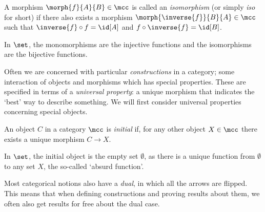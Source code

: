 \begin{definition}[Isomorphism]
    A morphism \(\morph{f}{A}{B} \in \mcc\) is called an \emph{isomorphism} (or
    simply \emph{iso} for short) if there also exists a morphism \(
    \morph{\inverse{f}}{B}{A} \in \mcc
    \) such that \(
    \inverse{f} \circ f = \id[A]
    \) and \(
    f \circ \inverse{f} = \id[B]
    \).
    \begin{center}
    \end{center}
\end{definition}

\begin{example}
    In \(\set\), the monomorphisms are the injective functions and the
    isomorphisms are the bijective functions.
\end{example}

Often we are concerned with particular \emph{constructions} in a category;
some interaction of objects and morphisms which has special properties.
These are specified in terms of a \emph{universal property}: a unique morphism
that indicates the `best' way to describe something.
We will first consider universal properties concerning special objects.

\begin{definition}
    An object \(C\) in a category \(\mcc\) is \emph{initial} if, for any other
    object \(X \in \mcc\) there exists a unique morphism \(C \to X\).
\end{definition}

\begin{example}
    In \(\set\), the initial object is the empty set \(\emptyset\), as there is
    a unique function from \(\emptyset\) to any set \(X\), the so-called
    `absurd function'.
\end{example}

Most categorical notions also have a \emph{dual}, in which all the
arrows are flipped.
This means that when defining constructions and proving results about them, we
often also get results for free about the dual case.

